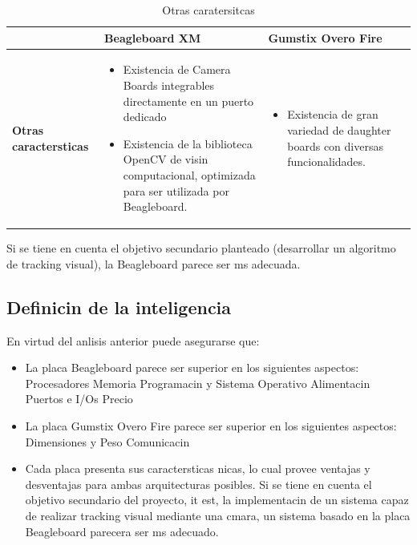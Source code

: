 \documentclass[spanish,12pt,a4paper,titlepage]{report}
\begin{document}
\begin{table}[H]
\begin{tabular}{p{130pt}|p{130pt}|p{130pt}|} 
\cline{2-3}
& \cellcolor[gray]{0.8} \textbf{Beagleboard XM} 
& \cellcolor[gray]{0.8} \textbf{Gumstix Overo Fire} \\ \cline{1-3} \hline
\multicolumn{1}{|p{130pt}|}{\cellcolor[gray]{0.8}\textbf{Otras caractersticas}} 
&\begin{itemize}
\item Existencia de Camera Boards integrables directamente en un puerto dedicado
\item Existencia de la biblioteca OpenCV de visin computacional, optimizada para ser utilizada por Beagleboard.
\end{itemize}

&\begin{itemize}
\item Existencia de gran variedad de daughter boards con diversas funcionalidades.
\end{itemize}\\ 
\hline 
\end{tabular}
\caption{Otras caratersitcas}
\label{tab:otras}
\end{table}

Si se tiene en cuenta el objetivo secundario  planteado (desarrollar un algoritmo de tracking visual), la Beagleboard parece ser ms adecuada.

\subsection{Definicin de la inteligencia}
\vspace*{15pt}

En virtud del anlisis anterior puede asegurarse que:

\begin{itemize}
\item La placa Beagleboard parece ser superior en los siguientes aspectos:
	\subitem Procesadores
	\subitem Memoria
	\subitem Programacin y Sistema Operativo
	\subitem Alimentacin
	\subitem Puertos e I/Os
	\subitem Precio
\item La placa Gumstix Overo Fire parece ser superior en los siguientes aspectos:
	\subitem Dimensiones y Peso
	\subitem Comunicacin
\item Cada placa presenta sus caractersticas nicas, lo cual provee ventajas y desventajas para ambas arquitecturas posibles. Si se tiene en cuenta el objetivo secundario del proyecto, it est, la implementacin de un sistema capaz de realizar tracking visual mediante una cmara, un sistema basado en la placa Beagleboard parecera ser ms adecuado.
\end{itemize}
\end{document}
